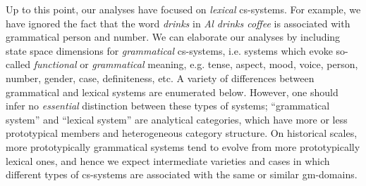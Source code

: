 Up to this point, our analyses have focused on \textit{lexical} cs-systems. For example, we have ignored the fact that the word \textit{drinks} in \textit{Al drinks coffee} is associated with grammatical person and number. We can elaborate our analyses by including state space dimensions for \textit{grammatical} cs-systems, i.e. systems which evoke so-called \textit{functional} or \textit{grammatical} meaning, e.g. tense, aspect, mood, voice, person, number, gender, case, definiteness, etc. A variety of differences between grammatical and lexical systems are enumerated below. However, one should infer no \textit{essential} distinction between these types of systems; “grammatical system” and “lexical system” are analytical categories, which have more or less prototypical members and heterogeneous category structure. On historical scales, more prototypically grammatical systems tend to evolve from more prototypically lexical ones, and hence we expect intermediate varieties and cases in which different types of cs-systems are associated with the same or similar gm-domains. 
